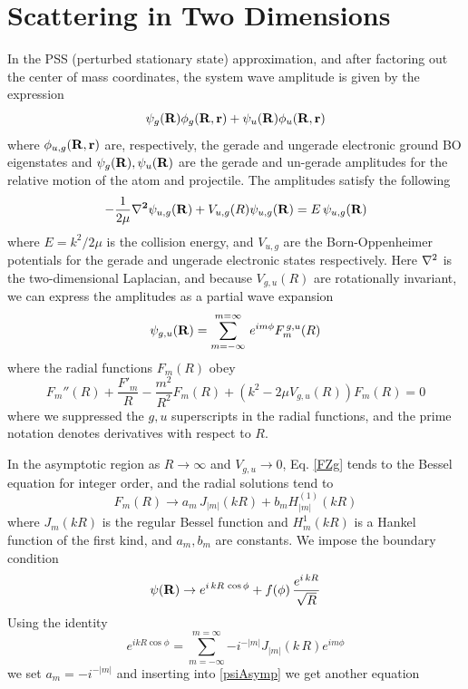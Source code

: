 \chapter{Scattering in Two Dimensions}

In the PSS (perturbed stationary state) approximation, and after factoring out the center of mass coordinates, the system wave amplitude is given by the expression
\begin{equation}
\psi_{g}({\bf R}) \phi_{g}({\bf R},{\bf r}) + \psi_{u}({\bf R}) \phi_{u}({\bf R},{\bf r})
\label{0.00}
\end{equation}
where $ \phi_{u,g}({\bf R},{\bf r}) $ are, respectively, the gerade and ungerade electronic ground BO eigenstates
and $\psi_{g}({\bf R}), \psi_{u}({\bf R}) $ are the gerade and
un-gerade amplitudes for the relative motion of the atom and projectile. The amplitudes satisfy the following
\begin{equation}
-\frac{1}{2 \mu} {\bf \nabla^2} \psi_{u,g}({\bf R}) + V_{u,g}(R)
\psi_{u,g}({\bf R}) = E \, \psi_{u,g}({\bf R})
\label{0.01}
\end{equation}
where $ E = k^2/2\mu $ is the collision energy, and $ V_{u,g} $
are the Born-Oppenheimer potentials for the gerade and ungerade
electronic states respectively. Here $ {\bf \nabla}^2 $ is the two-dimensional Laplacian, and because $ V_{g,u}(R) $ are rotationally invariant, we can express the amplitudes as a partial wave expansion
\begin{equation}
\psi_{g,u}({\bf R}) = \sum_{m=-\infty}^{m=\infty} \, e^{i m \phi} F^{\, g,u}_{m}(R)
\end{equation}
where the radial functions $F_{m}(R)$ obey
\begin{equation}\label{FZg}
F_{m}''(R) + \frac{F'_{m}}{R} - \frac{m^2}{R^2} F_{m}(R) + (k^2 - 2 \mu V_{g,u}(R)) F_{m}(R) =0
\end{equation}
where we suppressed the $g,u$ superscripts in the radial functions, and the prime notation denotes derivatives with respect to $R$.

In the asymptotic region as $ R \rightarrow \infty $ and $ V_{g,u} \rightarrow 0$,
Eq. \eqref{FZg} tends to the Bessel equation for integer order, and the radial solutions tend to
\begin{equation}\label{FAmpl}
F_{m}(R)\rightarrow a_{m} \, J_{|m|}(k R) + b_{m} H^{(1)}_{|m|}(k R)
\end{equation}
where $J_{m}(k R)$ is the regular Bessel function and $ H^{1}_{m}(k R) $ is a Hankel function of the first kind, and $a_{m},b_{m} $ are constants. We impose the boundary condition
\begin{equation}\label{psiAsymp}
\psi({\bf R}) \rightarrow e^{i \, k R \, \cos\phi} + f(\phi) \, \frac{e^{i \, k  R}}{\sqrt{R}} 
\end{equation}
Using the identity 
\begin{equation}
  e^{i k R \cos\phi} = \sum_{m=-\infty}^{m=\infty}{-i^{-|m|} J_{|m|}(k\,R) e^{i m \phi}}
\end{equation}
we set $ a_{m} = -i^{-|m|} $ and inserting into \eqref{psiAsymp} we get another equation

